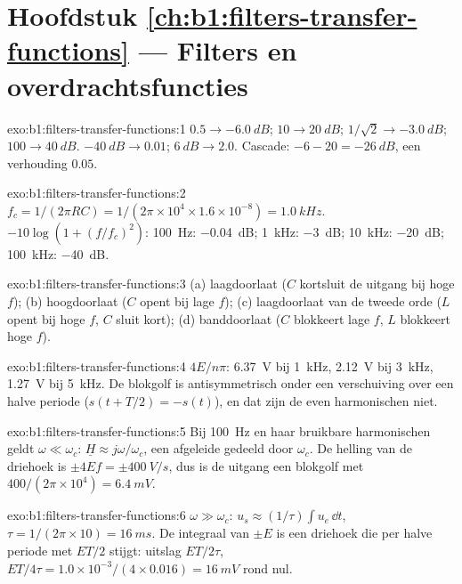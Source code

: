 \section*{Hoofdstuk \ref{ch:b1:filters-transfer-functions} --- Filters en overdrachtsfuncties}

\begin{solution}{exo:b1:filters-transfer-functions:1}
$0.5 \to \qty{-6.0}{dB}$; $10 \to \qty{20}{dB}$; $1/\sqrt2 \to \qty{-3.0}{dB}$;
$100 \to \qty{40}{dB}$. $\qty{-40}{dB} \to 0.01$; $\qty{+6}{dB} \to 2.0$.
Cascade: $-6 - 20 = \qty{-26}{dB}$, een verhouding $0.05$.
\end{solution}

\begin{solution}{exo:b1:filters-transfer-functions:2}
$f_c = 1/(2\pi RC) = 1/(2\pi \times 10^4 \times 1.6\times10^{-8}) =
\qty{1.0}{kHz}$.  $-10\log(1 + (f/f_c)^2)$: \qty{100}{Hz}:
\qty{-0.04}{dB}; \qty{1}{kHz}: \qty{-3}{dB}; \qty{10}{kHz}: \qty{-20}{dB};
\qty{100}{kHz}: \qty{-40}{dB}.
\end{solution}

\begin{solution}{exo:b1:filters-transfer-functions:3}
(a) laagdoorlaat ($C$ kortsluit de uitgang bij hoge $f$); (b) hoogdoorlaat ($C$
opent bij lage $f$); (c) laagdoorlaat van de tweede orde ($L$ opent bij hoge $f$,
$C$ sluit kort); (d) banddoorlaat ($C$ blokkeert lage $f$, $L$ blokkeert hoge $f$).
\end{solution}

\begin{solution}{exo:b1:filters-transfer-functions:4}
$4E/n\pi$: \qty{6.37}{V} bij \qty{1}{kHz}, \qty{2.12}{V} bij \qty{3}{kHz},
\qty{1.27}{V} bij \qty{5}{kHz}. De blokgolf is antisymmetrisch onder
een verschuiving over een halve periode ($s(t + T/2) = -s(t)$), en dat zijn de even
harmonischen niet.
\end{solution}

\begin{solution}{exo:b1:filters-transfer-functions:5}
Bij \qty{100}{Hz} en haar bruikbare harmonischen geldt $\omega \ll \omega_c$:
$\underline H \approx j\omega/\omega_c$, een afgeleide gedeeld door
$\omega_c$. De helling van de driehoek is $\pm 4Ef = \pm\qty{400}{V/s}$, dus
is de uitgang een blokgolf met  $400/(2\pi \times 10^4) =
\qty{6.4}{mV}$.
\end{solution}

\begin{solution}{exo:b1:filters-transfer-functions:6}
$\omega \gg \omega_c$: $u_s \approx (1/\tau)\int u_e\,\dd t$, $\tau =
1/(2\pi \times 10) = \qty{16}{ms}$. De integraal van $\pm E$ is een
driehoek die per halve periode met $ET/2$ stijgt: uitslag $ET/2\tau$, 
$ET/4\tau = 1.0 \times 10^{-3}/(4 \times 0.016) = \qty{16}{mV}$ rond
nul.
\end{solution}

